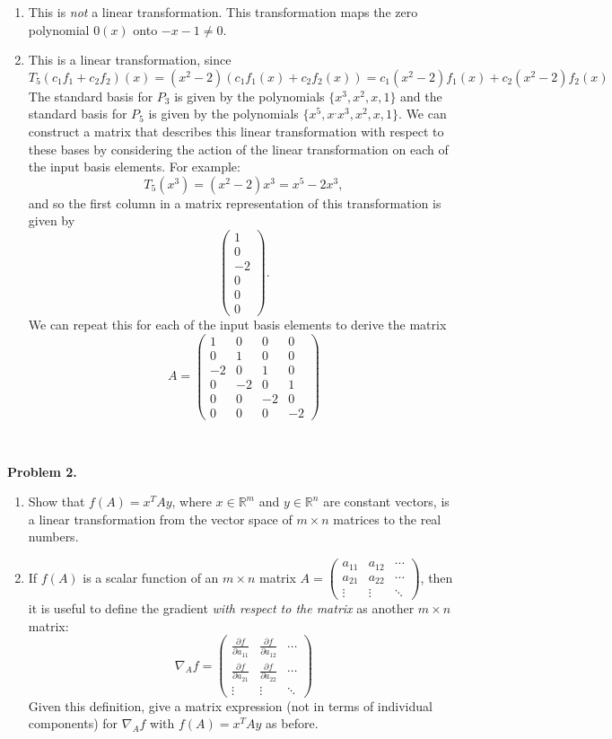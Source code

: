 \documentclass[11pt]{article}
\begin{document}
\begin{enumerate}
\item This is \emph{not} a linear transformation. This transformation maps the zero polynomial $0(x)$ onto $-x-1 \neq 0 $. 

\item This is a linear transformation, since
$$T_5(c_1f_1 + c_2f_2)(x) = (x^2 - 2)(c_1f_1(x)+c_2f_2(x)) = c_1 (x^2-2)f_1(x) +  c_2 (x^2-2)f_2(x)$$
The standard basis for $P_3$ is given by the polynomials $\{x^3, x^2,x,1\}$ and the standard basis for $P_5$ is given by the polynomials $\{x^5,x^,x^3, x^2,x,1\}$. We can construct a matrix that describes this linear transformation with respect to these bases by considering the action of the linear transformation on each of the input basis elements. For example:
$$T_5(x^3) = (x^2-2)x^3 = x^5 - 2x^3,$$
and so the first column in a matrix representation of this transformation is given by
$$\begin{pmatrix} 1 \\ 0 \\ -2 \\ 0 \\ 0 \\ 0 \end{pmatrix}.$$
We can repeat this for each of the input basis elements to derive the matrix
$$A = \begin{pmatrix} 1 & 0 & 0 & 0 \\ 0 & 1 & 0 & 0 \\ -2 & 0 & 1 & 0 \\ 0 & -2 & 0 & 1 \\ 0 & 0 & -2 & 0 \\ 0 & 0 & 0 & -2 \end{pmatrix}$$
\end{enumerate}

\

\noindent \textbf{Problem 2.}\\
\begin{enumerate}
\item Show that $f(A) = x^T A y$, where $x\in \mathbb{R}^m$ and $y\in \mathbb{R}^n$ are constant vectors, is a linear transformation from the vector space of $m\times n$ matrices to the real numbers.
\item If $f(A)$ is a scalar function of an $m\times n$ matrix $A = \begin{pmatrix} a_{11} & a_{12} & \cdots \\ a_{21} & a_{22} & \cdots \\ \vdots & \vdots & \ddots \end{pmatrix}$, then it is useful to define the gradient \emph{with respect to the matrix} as another $m\times n$ matrix:
$$
\nabla_A f = \begin{pmatrix} \frac{\partial f}{\partial a_{11}} & \frac{\partial f}{\partial a_{12}} & \cdots \\ \frac{\partial f}{\partial a_{21}} & \frac{\partial f}{\partial a_{22}} & \cdots \\ \vdots & \vdots & \ddots \end{pmatrix}
$$
Given this definition, give a matrix expression (not in terms of individual components) for $\nabla_A f$ with $f(A) = x^T A y$ as before.
\end{enumerate}
\end{document}

